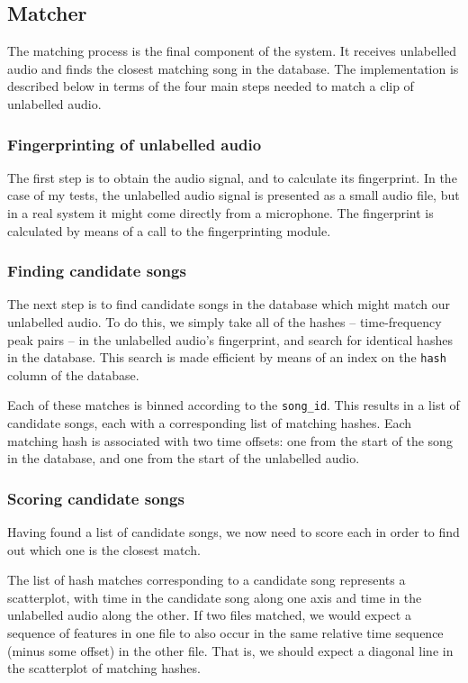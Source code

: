 \documentclass[12pt,a4paper,twoside,openright]{report}
\begin{document}
\subsection{Matcher}
\label{shazam:matcher}

The matching process is the final component of the system. It receives unlabelled audio and finds the closest matching song in the database. The implementation is described below in terms of the four main steps needed to match a clip of unlabelled audio.

\subsubsection{Fingerprinting of unlabelled audio}

The first step is to obtain the audio signal, and to calculate its fingerprint. In the case of my tests, the unlabelled audio signal is presented as a small audio file, but in a real system it might come directly from a microphone. The fingerprint is calculated by means of a call to the fingerprinting module.

\subsubsection{Finding candidate songs}

The next step is to find candidate songs in the database which might match our unlabelled audio. To do this, we simply take all of the hashes -- time-frequency peak pairs -- in the unlabelled audio's fingerprint, and search for identical hashes in the database. This search is made efficient by means of an index on the \lstinline{hash} column of the database.

Each of these matches is binned according to the \lstinline{song_id}. This results in a list of candidate songs, each with a corresponding list of matching hashes. Each matching hash is associated with two time offsets: one  from the start of the song in the database, and one from the start of the unlabelled audio.

\subsubsection{Scoring candidate songs}

Having found a list of candidate songs, we now need to score each in order to find out which one is the closest match.

The list of hash matches corresponding to a candidate song represents a scatterplot, with time in the candidate song along one axis and time in the unlabelled audio along the other. If two files matched, we would expect a sequence of features in one file to also occur in the same relative time sequence (minus some offset) in the other file. That is, we should expect a diagonal line in the scatterplot of matching hashes.
\end{document}

